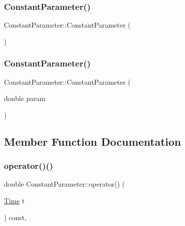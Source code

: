 \subsubsection{\texorpdfstring{Constant\+Parameter()}{ConstantParameter()}\hspace{0.1cm}{\footnotesize\ttfamily [1/2]}}
{\footnotesize\ttfamily Constant\+Parameter\+::\+Constant\+Parameter (\begin{DoxyParamCaption}{ }\end{DoxyParamCaption})\hspace{0.3cm}{\ttfamily [default]}}

\hypertarget{class_constant_parameter_ae3bc9ec65c93b6b88fe04dcb7010d897}{}\label{class_constant_parameter_ae3bc9ec65c93b6b88fe04dcb7010d897} 
\subsubsection{\texorpdfstring{Constant\+Parameter()}{ConstantParameter()}\hspace{0.1cm}{\footnotesize\ttfamily [2/2]}}
{\footnotesize\ttfamily Constant\+Parameter\+::\+Constant\+Parameter (\begin{DoxyParamCaption}\item[{double}]{param }\end{DoxyParamCaption})}



\subsection{Member Function Documentation}
\hypertarget{class_constant_parameter_a23abb141692843e2ef68d43f610beb5e}{}\label{class_constant_parameter_a23abb141692843e2ef68d43f610beb5e} 
\subsubsection{\texorpdfstring{operator()()}{operator()()}\hspace{0.1cm}{\footnotesize\ttfamily [1/2]}}
{\footnotesize\ttfamily double Constant\+Parameter\+::operator() (\begin{DoxyParamCaption}\item[{\hyperlink{_name_def_8h_ac2d3e0ba793497bcca555c7c2cf64ff3}{Time}}]{t }\end{DoxyParamCaption}) const\hspace{0.3cm}{\ttfamily [override]}, {\ttfamily [virtual]}}



